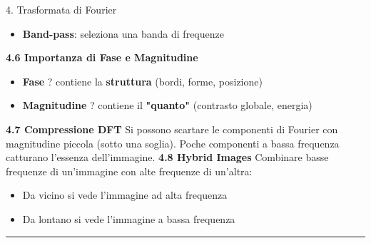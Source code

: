 \documentclass[italian,10pt]{beamer}
\begin{document}
\begin{frame}[allowframebreaks]{4. Trasformata di Fourier}
\begin{itemize}
\item \textbf{Band-pass}: seleziona una banda di frequenze
\end{itemize}
\textbf{4.6 Importanza di Fase e Magnitudine}
\begin{itemize}
\item \textbf{Fase} ? contiene la \textbf{struttura} (bordi, forme, posizione)
\item \textbf{Magnitudine} ? contiene il \textbf{"quanto"} (contrasto globale, energia)
\end{itemize}
\textbf{4.7 Compressione DFT}
Si possono scartare le componenti di Fourier con magnitudine piccola (sotto una soglia). Poche componenti a bassa frequenza catturano l'essenza dell'immagine.
\textbf{4.8 Hybrid Images}
Combinare basse frequenze di un'immagine con alte frequenze di un'altra:
\begin{itemize}
\item Da vicino si vede l'immagine ad alta frequenza
\item Da lontano si vede l'immagine a bassa frequenza
\end{itemize}
\medskip\noindent\rule{\textwidth}{0.4pt}\medskip
\end{frame}
\end{document}
